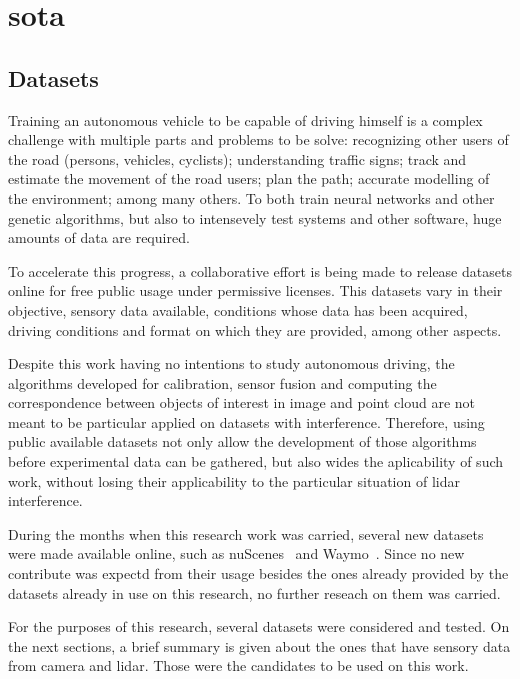 \chapter{\acl{sota}}
\label{chapter:sota}

\section{Datasets}
\label{section:sota:datasets}

Training an autonomous vehicle to be capable of driving himself is a complex challenge with multiple parts and problems to be solve: recognizing other users of the road (persons, vehicles, cyclists); understanding traffic signs; track and estimate the movement of the road users; plan the path; accurate modelling of the environment; among many others. To both train neural networks and other genetic algorithms, but also to intensevely test systems and other software, huge amounts of data are required.

To accelerate this progress, a collaborative effort is being made to release datasets online for free public usage under permissive licenses. This datasets vary in their objective, sensory data available, conditions whose data has been acquired, driving conditions and format on which they are provided, among other aspects. 

Despite this work having no intentions to study autonomous driving, the algorithms developed for calibration, sensor fusion and computing the correspondence between objects of interest in image and point cloud are not meant to be particular applied on datasets with interference. Therefore, using public available datasets not only allow the development of those algorithms before experimental data can be gathered, but also wides the aplicability of such work, without losing their applicability to the particular situation of \ac{lidar} interference.

During the months when this research work was carried, several new datasets were made available online, such as nuScenes~\cite{nuScenes2019} and Waymo~\cite{Waymo}. Since no new contribute was expectd from their usage besides the ones already provided by the datasets already in use on this research, no further reseach on them was carried. 

For the purposes of this research, several datasets were considered and tested. On the next sections, a brief summary is given about the ones that have sensory data from camera and \ac{lidar}. Those were the candidates to be used on this work.

